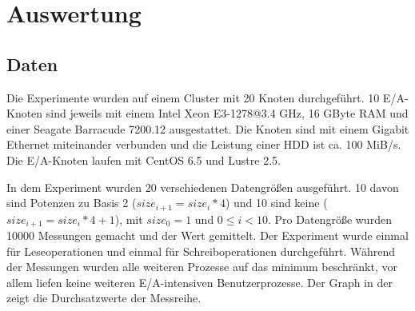 
\section{Auswertung}

\subsection{Daten}


Die Experimente wurden auf einem Cluster mit 20 Knoten durchgeführt.
10 E/A-Knoten sind jeweils mit einem Intel Xeon E3-1278@3.4 GHz, 16 GByte RAM und einer Seagate Barracude 7200.12 ausgestattet.
Die Knoten sind mit einem Gigabit Ethernet miteinander verbunden und die Leistung einer HDD ist ca. 100 MiB/s.
Die E/A-Knoten laufen mit CentOS 6.5 und Lustre 2.5.

In dem Experiment wurden 20 verschiedenen Datengrößen ausgeführt.
10 davon sind Potenzen zu Basis 2 ($size_{i+1} = size_i * 4$) und 10 sind keine ($size_{i+1} = size_i * 4 + 1$), mit $size_0 = 1$ und $0 \leq i < 10$.
Pro Datengröße wurden 10000 Messungen gemacht und der Wert gemittelt.
Der Experiment wurde einmal für Leseoperationen und einmal für Schreiboperationen durchgeführt.
Während der Messungen wurden alle weiteren Prozesse auf das minimum beschränkt, vor allem liefen keine weiteren E/A-intensiven Benutzerprozesse.
Der Graph in der  zeigt die Durchsatzwerte der Messreihe.




